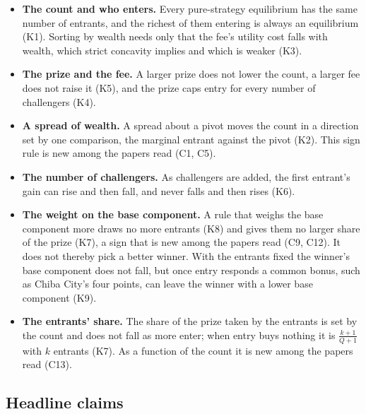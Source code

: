 \begin{itemize}
\item \textbf{The count and who enters.} Every pure-strategy equilibrium has the
  same number of entrants, and the richest of them entering is always an
  equilibrium (K1). Sorting by wealth needs only that the fee's utility cost
  falls with wealth, which strict concavity implies and which is weaker (K3).
\item \textbf{The prize and the fee.} A larger prize does not lower the count,
  a larger fee does not raise it (K5), and the prize caps entry for every number
  of challengers (K4).
\item \textbf{A spread of wealth.} A spread about a pivot moves the count in a
  direction set by one comparison, the marginal entrant against the pivot (K2).
  This sign rule is new among the papers read (C1, C5).
\item \textbf{The number of challengers.} As challengers are added, the first
  entrant's gain can rise and then fall, and never falls and then rises (K6).
\item \textbf{The weight on the base component.} A rule that weighs the base
  component more draws no more entrants (K8) and gives them no larger share of
  the prize (K7), a sign that is new among the papers read (C9, C12). It does
  not thereby pick a better winner. With the entrants fixed the winner's base
  component does not fall, but once entry responds a common bonus, such as
  Chiba City's four points, can leave the winner with a lower base component
  (K9).
\item \textbf{The entrants' share.} The share of the prize taken by the
  entrants is set by the count and does not fall as more enter; when entry buys
  nothing it is $\frac{k+1}{Q+1}$ with $k$ entrants (K7). As a function of the
  count it is new among the papers read (C13).
\end{itemize}

\subsection{Headline claims}
\label{sec:headlines}

